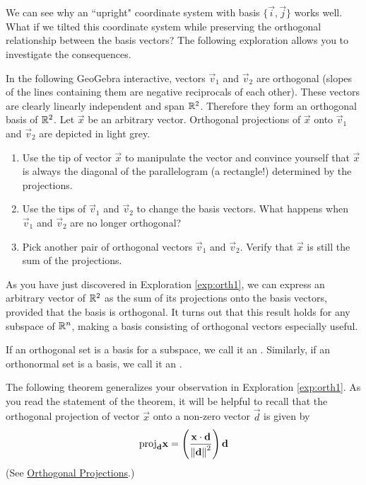 \documentclass{ximera}
\begin{document}
We can see why an ``upright" coordinate system with basis $\{\vec{i},\vec{j}\}$ works well.  What if we tilted this coordinate system while preserving the orthogonal relationship between the basis vectors?  The following exploration allows you to investigate the consequences.

\begin{exploration}\label{exp:orth1}
    In the following GeoGebra interactive, vectors $\vec{v}_1$ and $\vec{v}_2$ are orthogonal (slopes of the lines containing them are negative reciprocals of each other).  These vectors are clearly linearly independent and span $\mathbb{R}^2$.  Therefore they form an orthogonal basis of $\mathbb{R}^2$.  Let $\vec{x}$ be an arbitrary vector.  Orthogonal projections of $\vec{x}$ onto $\vec{v}_1$ and $\vec{v}_2$ are depicted in light grey.
    \begin{enumerate}
        \item Use the tip of vector $\vec{x}$ to manipulate the vector and convince yourself that $\vec{x}$ is always the diagonal of the parallelogram (a rectangle!) determined by the projections.
        \item Use the tips of $\vec{v}_1$ and $\vec{v}_2$ to change the basis vectors.  What happens when $\vec{v}_1$ and $\vec{v}_2$ are no longer orthogonal?
        \item Pick another pair of orthogonal vectors $\vec{v}_1$ and $\vec{v}_2$.  Verify that $\vec{x}$ is still the sum of the projections.
    \end{enumerate}

    \begin{center}
\end{center}
\end{exploration}


As you have just discovered in Exploration \ref{exp:orth1}, we can express an arbitrary vector of $\mathbb{R}^2$ as the sum of its projections onto the basis vectors, provided that the basis is orthogonal. It turns out that this result holds for any subspace of $\mathbb{R}^n$, making a basis consisting of orthogonal vectors especially useful. 

If an orthogonal set is a basis for a subspace, we call it an
. Similarly, if an orthonormal set is a basis, we call it an .


The following theorem generalizes your observation in Exploration \ref{exp:orth1}.  As you read the statement of the theorem, it will be helpful to recall that the orthogonal projection of vector $\vec{x}$ onto a non-zero vector $\vec{d}$ is given by
\begin{equation}\label{eq:orthProj}
\mbox{proj}_{\mathbf{d}}\mathbf{x}=\left(\frac{\mathbf{x}\cdot\mathbf{d}}{\left\lVert\mathbf{d}\right\rVert^2}\right)\mathbf{d}
\end{equation}
(See \href{https://ximera.osu.edu/oerlinalg/LinearAlgebra/VEC-0070/main}{Orthogonal Projections}.)
\end{document}

